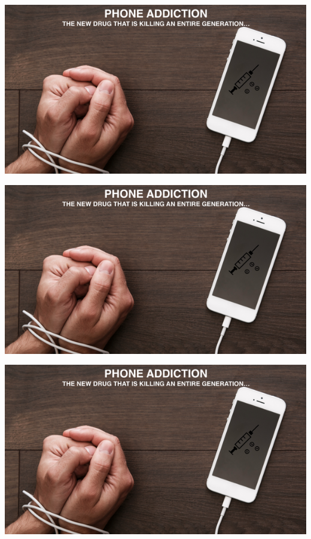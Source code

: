 \documentclass{beamer}
\begin{document}
    
  \begin{frame}
  \hspace{1.5cm}
  \includegraphics[scale=0.35]{ANGS3/addiction.png}
  \end{frame}
  
  \begin{frame}
  \hspace{1.5cm}
  \includegraphics[scale=0.35]{ANGS3/addiction.png}
  \end{frame}
  
  \begin{frame}
  \hspace{1.5cm}
  \includegraphics[scale=0.25]{ANGS3/addiction.png}
  \end{frame}
  
\end{document}
